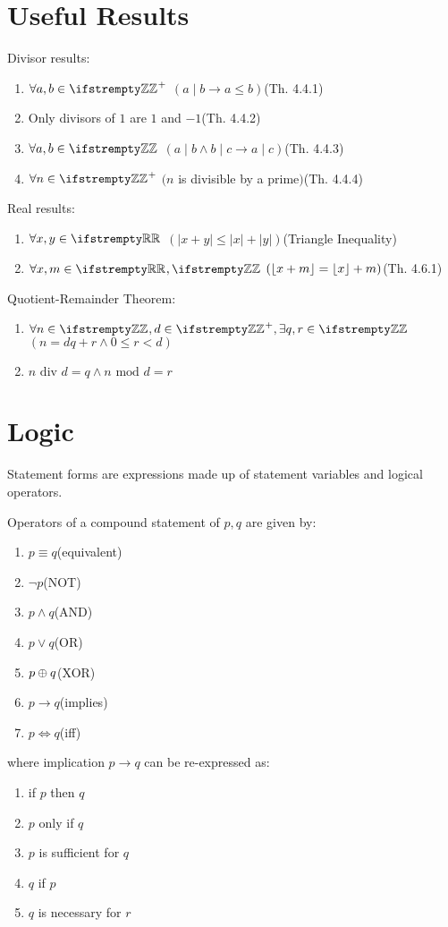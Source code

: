 \documentclass[12pt, a4paper]{article}
\begin{document}
\begin{multicols*}{3}
\section*{Useful Results}
Divisor results:
\begin{enumerate}[\roman*.]
  \item $\forall a, b \in \ZZ^+$ $(a\mid b \rightarrow a \leq b)$\hfill(Th. 4.4.1)
  \item Only divisors of $1$ are $1$ and $-1$\hfill(Th. 4.4.2)
  \item $\forall a, b \in \ZZ$ $(a\mid b \land b\mid c \rightarrow a \mid c)$\hfill(Th. 4.4.3)
  \item $\forall n \in \ZZ^+$ $(n$ is divisible by a prime$)$\hfill(Th. 4.4.4)
\end{enumerate}

Real results:
\begin{enumerate}[\roman*.]
  \item $\forall x, y \in \RR$ $(|x+y| \leq |x| + |y|)$\hfill(Triangle Inequality)
  \item $\forall x,m \in \RR, \ZZ$ $(\left\lfloor x+m \right\rfloor = \left\lfloor x \right\rfloor + m)$\hfill(Th. 4.6.1)
\end{enumerate}

Quotient-Remainder Theorem:
\begin{enumerate}[\roman*.]
  \item $\forall n \in \ZZ, d \in \ZZ^+, \exists q, r \in \ZZ$ $(n=dq + r \land 0 \leq r < d)$
  \item $n \text{ div } d = q \land n \text{ mod } d = r$
\end{enumerate}
\colbreak

\section{Logic}
Statement forms are expressions made up of statement variables and logical operators.

Operators of a compound statement of $p,q$ are given by:
\begin{enumerate}[\roman*.]
  \item $p \equiv q$\hfill(equivalent)
  \item $\neg p$\hfill(NOT)
  \item $p \land q$\hfill(AND)
  \item $p \lor q$\hfill(OR)
  \item $p \oplus q$\hfill(XOR)
  \item $p \rightarrow q$\hfill(implies)
  \item $p \iff q$\hfill(iff) 
\end{enumerate}
where implication $p \rightarrow q$ can be re-expressed as:
\begin{enumerate}[\roman*.]
  \item if $p$ then $q$
  \item $p$ only if $q$
  \item $p$ is sufficient for $q$
  \item $q$ if $p$
  \item $q$ is necessary for $r$
\end{enumerate}


\end{multicols*}
\end{document}
